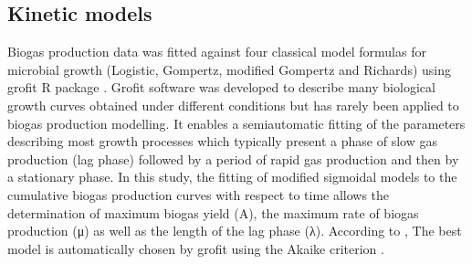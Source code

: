 \subsection{Kinetic models}
Biogas production data was fitted against four classical model formulas for microbial growth (Logistic, Gompertz, modified Gompertz and Richards) using grofit R package \cite{Kahm_2010}. Grofit software was developed to describe many biological growth curves obtained under different conditions but has rarely been applied to biogas production modelling. It enables a semiautomatic fitting of the parameters describing most growth processes which typically present a phase of slow gas production (lag phase) followed by a period of rapid gas production and then by a stationary phase. In this study, the fitting of modified sigmoidal models to the cumulative biogas production curves  with respect to time allows the determination of maximum biogas yield (A), the maximum rate of biogas production (μ) as well as the length of the lag phase (λ). According to \cite{Zwietering1990},  The best model is automatically chosen by grofit using the Akaike criterion \cite{Hasenbrink_2006}.